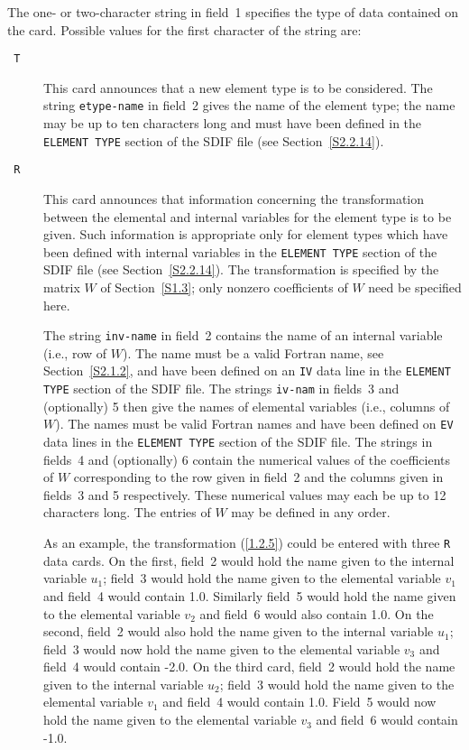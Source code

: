 \documentclass[a4paper]{article}
\newcommand{\req}[1]{(\ref{#1})}
\newcommand{\itt}[1]{\item[\tt #1]}
\begin{document}
The one- or two-character string in field~1 specifies the type  of data
contained on the card.
Possible values for the first character  of the string are:
\begin{description}
\itt{ T}
This card
announces that a new element type
is to  be considered. The
string {\tt  etype-name} in field~2  gives the name of  the element
type;  the name may be  up to  ten characters long  and must have been
defined in   the {\tt ELEMENT TYPE}   section  of the SDIF  file  (see
Section~\ref{S2.2.14}).
\itt{ R}
This card   announces that information  concerning the  transformation
between the elemental and  internal variables for  the element type is
to be  given. Such information  is appropriate  only for element types
which have  been  defined with internal  variables in the {\tt ELEMENT
TYPE}
section  of   the  SDIF  file   (see   Section~\ref{S2.2.14}).     The
transformation is specified by  the matrix $W$  of Section~\ref{S1.3};
only nonzero coefficients of $W$ need be specified here.

The  string {\tt  inv-name}  in  field~2  contains the  name of  an
internal variable  (i.e., row  of   $W$).   The name  must be  a valid
Fortran name,
see Section~\ref{S2.1.2},  and have been defined on  an {\tt IV}
data line in the {\tt ELEMENT TYPE}
section of the SDIF file.  The  strings {\tt iv-nam} in fields~3 and
(optionally) 5  then  give  the names of   elemental  variables (i.e.,
columns of $W$).  The names must be valid Fortran  names and have been
defined on {\tt EV}
data  lines in  the  {\tt ELEMENT TYPE}
section of the SDIF  file. The strings in  fields~4 and (optionally) 6
contain the numerical values of the  coefficients of $W$ corresponding
to the row given in  field~2 and the columns  given  in fields~3 and 5
respectively.  These numerical values may each be  up to 12 characters
long.  The entries of $W$ may be defined in any order.

As an example, the  transformation \req{1.2.5} could be   entered with
three {\tt R}
data cards.
On the first,  field~2  would hold the name
given to   the internal variable  $u_1$; field~3   would hold the name
given to  the elemental variable $v_1$  and field~4 would contain 1.0.
Similarly field~5 would hold the name given  to the elemental variable
$v_2$ and  field~6 would also contain 1.0.    On   the second, field~2
would also   hold the name  given  to  the internal variable   $u_ 1$;
field~3 would now hold the name given  to the elemental variable $v_3$
and field~4 would contain -2.0.  On the third card, field~2 would hold
the name given to the internal  variable $u_2$; field~3 would hold the
name given to the elemental  variable $v_1$ and field~4  would contain
1.0. Field~5 would now hold  the name  given to the elemental variable
$v_3$ and field~6 would contain -1.0.


\end{description}
\end{document}
